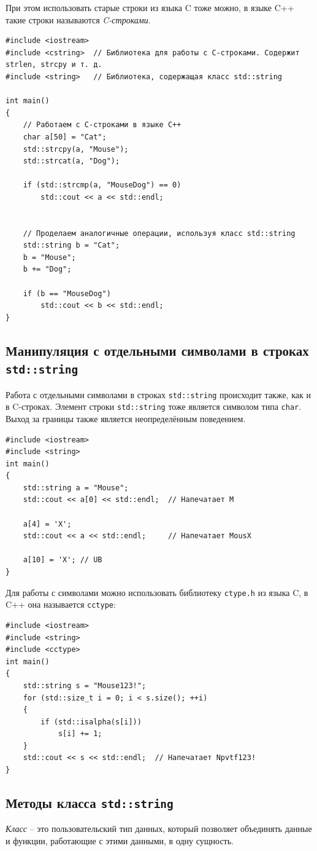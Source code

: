 \documentclass{article}
\begin{document}
При этом использовать старые строки из языка C тоже можно, в языке C++ такие строки называются \textit{C-строками}.
\begin{lstlisting}
#include <iostream>
#include <cstring>  // Библиотека для работы с C-строками. Содержит strlen, strcpy и т. д.
#include <string>   // Библиотека, содержащая класс std::string

int main()
{
    // Работаем с C-строками в языке C++
    char a[50] = "Cat";
    std::strcpy(a, "Mouse");
    std::strcat(a, "Dog");
    
    if (std::strcmp(a, "MouseDog") == 0)
        std::cout << a << std::endl;
        
        
    // Проделаем аналогичные операции, используя класс std::string
    std::string b = "Cat";
    b = "Mouse";
    b += "Dog";
    
    if (b == "MouseDog")
        std::cout << b << std::endl;
}
\end{lstlisting}

\subsection*{Манипуляция с отдельными символами в строках \texttt{std::string}}
Работа с отдельными символами в строках \texttt{std::string} происходит также, как и в C-строках.
Элемент строки \texttt{std::string} тоже является символом типа \texttt{char}. Выход за границы также является неопределённым поведением.
\begin{lstlisting}
#include <iostream>
#include <string>
int main()
{
    std::string a = "Mouse";
    std::cout << a[0] << std::endl;  // Напечатает M
    
    a[4] = 'X';
    std::cout << a << std::endl;     // Напечатает MousX
    
    a[10] = 'X'; // UB
}
\end{lstlisting}
Для работы с символами можно использовать библиотеку \texttt{ctype.h} из языка C, в C++ она называется \texttt{cctype}:
\begin{lstlisting}
#include <iostream>
#include <string>
#include <cctype>
int main()
{
    std::string s = "Mouse123!";
    for (std::size_t i = 0; i < s.size(); ++i)
    {
        if (std::isalpha(s[i]))
            s[i] += 1;
    }
    std::cout << s << std::endl;  // Напечатает Npvtf123!
}
\end{lstlisting}



\subsection*{Методы класса \texttt{std::string}}
\textit{Класс} -- это пользовательский тип данных, который позволяет объединять данные и функции, работающие с этими данными, в одну сущность.
\end{document}
